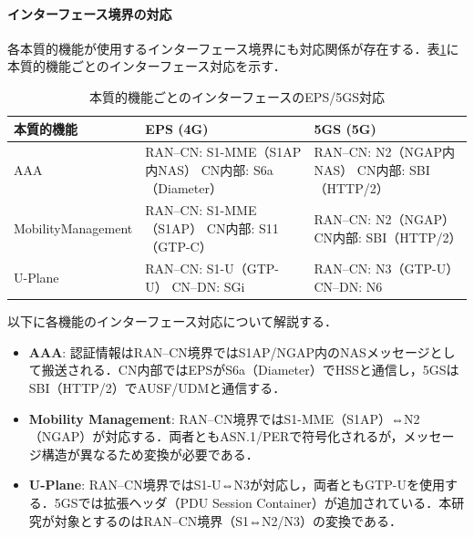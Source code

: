 \paragraph{インターフェース境界の対応}

各本質的機能が使用するインターフェース境界にも対応関係が存在する．表\ref{tab:interface_mapping}に本質的機能ごとのインターフェース対応を示す．

\begin{table}[htbp]
\centering
\caption{本質的機能ごとのインターフェースのEPS/5GS対応}
\label{tab:interface_mapping}
\begin{tabular}{|p{3cm}|p{5.5cm}|p{5.5cm}|}
\hline
\textbf{本質的機能} & \textbf{EPS (4G)} & \textbf{5GS (5G)} \\
\hline
AAA &
RAN--CN: S1-MME（S1AP内NAS）\newline
CN内部: S6a（Diameter） &
RAN--CN: N2（NGAP内NAS）\newline
CN内部: SBI（HTTP/2） \\
\hline
Mobility\newline Management &
RAN--CN: S1-MME（S1AP）\newline
CN内部: S11（GTP-C） &
RAN--CN: N2（NGAP）\newline
CN内部: SBI（HTTP/2） \\
\hline
U-Plane &
RAN--CN: S1-U（GTP-U）\newline
CN--DN: SGi &
RAN--CN: N3（GTP-U）\newline
CN--DN: N6 \\
\hline
\end{tabular}
\end{table}

以下に各機能のインターフェース対応について解説する．

\begin{itemize}
  \item \textbf{AAA}: 認証情報はRAN--CN境界ではS1AP/NGAP内のNASメッセージとして搬送される．CN内部ではEPSがS6a（Diameter）でHSSと通信し，5GSはSBI（HTTP/2）でAUSF/UDMと通信する．
  \item \textbf{Mobility Management}: RAN--CN境界ではS1-MME（S1AP）⇔N2（NGAP）が対応する．両者ともASN.1/PERで符号化されるが，メッセージ構造が異なるため変換が必要である．
  \item \textbf{U-Plane}: RAN--CN境界ではS1-U⇔N3が対応し，両者ともGTP-Uを使用する．5GSでは拡張ヘッダ（PDU Session Container）が追加されている．本研究が対象とするのはRAN--CN境界（S1⇔N2/N3）の変換である．
\end{itemize}


